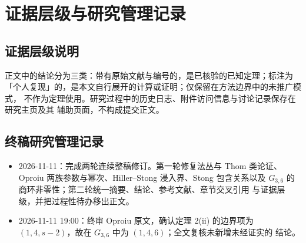 \section{证据层级与研究管理记录}
\label{app:log}

\subsection{证据层级说明}

正文中的结论分为三类：带有原始文献与编号的，是已核验的已知定理；标注为
「个人复现」的，是本文自行展开的计算或证明；仅保留在方法边界中的未推广模式，
不作为定理使用。研究过程中的历史日志、附件访问信息与讨论记录保存在研究主页及其
辅助页面，不构成提交正文。

\subsection{终稿研究管理记录}

\begin{itemize}[leftmargin=1.6em,itemsep=0.35em]
  \item 2026-11-11：完成两轮连续整稿修订。第一轮修复法丛与 Thom 类论证、
        Oproiu 两族参数与幂次、Hiller--Stong 浸入界、Stong 包含关系以及
        $G_{3,6}$ 的商环非零性；第二轮统一摘要、结论、参考文献、章节交叉引用
        与证据层级，并把过程性待办移出正文。
  \item 2026-11-11 19:00：终审 Oproiu 原文，确认定理 2(ii) 的边界项为
        $(1,4,s-2)$，故在 $G_{3,6}$ 中为 $(1,4,6)$；全文复核未新增未经证实的
        结论。
\end{itemize}
